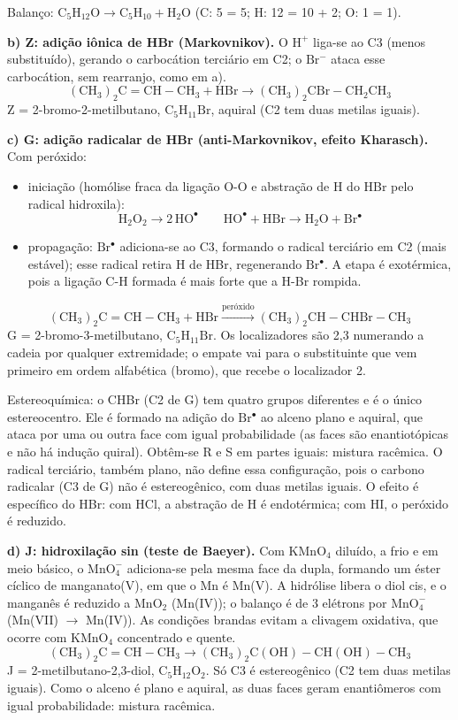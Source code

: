 \documentclass{article}%
\begin{document}
Balanço: $\mathrm{C_5H_{12}O \rightarrow C_5H_{10} + H_2O}$ (C: 5 = 5; H: 12 = 10 + 2; O: 1 = 1).

\textbf{b) Z: adição iônica de HBr (Markovnikov).} O $\mathrm{H^{+}}$ liga-se ao C3 (menos substituído), gerando o carbocátion terciário em C2; o $\mathrm{Br^{-}}$ ataca esse carbocátion, sem rearranjo, como em a).
\[ (\mathrm{CH_3})_2\mathrm{C{=}CH{-}CH_3} + \mathrm{HBr} \rightarrow (\mathrm{CH_3})_2\mathrm{CBr{-}CH_2CH_3} \]
Z = 2-bromo-2-metilbutano, $\mathrm{C_5H_{11}Br}$, aquiral (C2 tem duas metilas iguais).

\textbf{c) G: adição radicalar de HBr (anti-Markovnikov, efeito Kharasch).} Com peróxido:
\begin{itemize}
\item iniciação (homólise fraca da ligação O-O e abstração de H do HBr pelo radical hidroxila):
\[ \mathrm{H_2O_2 \rightarrow 2\,HO^{\bullet}} \qquad \mathrm{HO^{\bullet} + HBr \rightarrow H_2O + Br^{\bullet}} \]
\item propagação: $\mathrm{Br^{\bullet}}$ adiciona-se ao C3, formando o radical terciário em C2 (mais estável); esse radical retira H de HBr, regenerando $\mathrm{Br^{\bullet}}$. A etapa é exotérmica, pois a ligação C-H formada é mais forte que a H-Br rompida.
\end{itemize}
\[ (\mathrm{CH_3})_2\mathrm{C{=}CH{-}CH_3} + \mathrm{HBr} \xrightarrow{\text{peróxido}} (\mathrm{CH_3})_2\mathrm{CH{-}CHBr{-}CH_3} \]
G = 2-bromo-3-metilbutano, $\mathrm{C_5H_{11}Br}$. Os localizadores são {2,3} numerando a cadeia por qualquer extremidade; o empate vai para o substituinte que vem primeiro em ordem alfabética (bromo), que recebe o localizador 2.

Estereoquímica: o CHBr (C2 de G) tem quatro grupos diferentes e é o único estereocentro. Ele é formado na adição do $\mathrm{Br^{\bullet}}$ ao alceno plano e aquiral, que ataca por uma ou outra face com igual probabilidade (as faces são enantiotópicas e não há indução quiral). Obtêm-se R e S em partes iguais: mistura racêmica. O radical terciário, também plano, não define essa configuração, pois o carbono radicalar (C3 de G) não é estereogênico, com duas metilas iguais. O efeito é específico do HBr: com HCl, a abstração de H é endotérmica; com HI, o peróxido é reduzido.

\textbf{d) J: hidroxilação sin (teste de Baeyer).} Com $\mathrm{KMnO_4}$ diluído, a frio e em meio básico, o $\mathrm{MnO_4^{-}}$ adiciona-se pela mesma face da dupla, formando um éster cíclico de manganato(V), em que o Mn é Mn(V). A hidrólise libera o diol cis, e o manganês é reduzido a $\mathrm{MnO_2}$ (Mn(IV)); o balanço é de 3 elétrons por $\mathrm{MnO_4^{-}}$ (Mn(VII) $\rightarrow$ Mn(IV)). As condições brandas evitam a clivagem oxidativa, que ocorre com $\mathrm{KMnO_4}$ concentrado e quente.
\[ (\mathrm{CH_3})_2\mathrm{C{=}CH{-}CH_3} \rightarrow (\mathrm{CH_3})_2\mathrm{C(OH){-}CH(OH){-}CH_3} \]
J = 2-metilbutano-2,3-diol, $\mathrm{C_5H_{12}O_2}$. Só C3 é estereogênico (C2 tem duas metilas iguais). Como o alceno é plano e aquiral, as duas faces geram enantiômeros com igual probabilidade: mistura racêmica.
\end{document}
